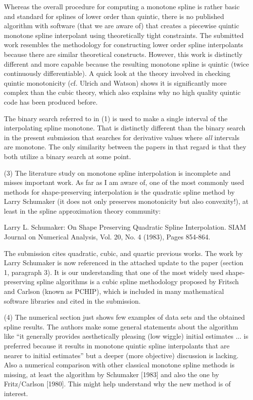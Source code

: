 Whereas the overall procedure for computing a monotone spline is rather basic and standard for splines of lower order than quintic, there is no published algorithm with software (that we are aware of) that creates a piecewise quintic monotone spline interpolant using theoretically tight constraints. The submitted work resembles the methodology for constructing lower order spline interpolants because there are similar theoretical constructs. However, this work is distinctly different and more capable because the resulting monotone spline is quintic (twice continuously differentiable). A quick look at the theory involved in checking quintic monotonicity (cf. Ulrich and Watson) shows it is significantly more complex than the cubic theory, which also explains why no high quality quintic code has been produced before.

The binary search referred to in (1) is used to make a single interval of the interpolating spline monotone. That is distinctly different than the binary search in the present submission that searches for derivative values where {\it all} intervals are monotone. The only similarity between the papers in that regard is that they both utilize a binary search at some point.

{\parindent=20pt \it

\item{(3)} The literature study on monotone spline interpolation is incomplete and misses important work. As far as I am aware of, one of the most commonly used methods for shape-preserving interpolation is the quadratic spline method by Larry Schumaker (it does not only preserves monotonicity but also convexity!), at least in the spline approximation theory community:

\itemitem{} Larry L. Schumaker: On Shape Preserving Quadratic Spline Interpolation. SIAM Journal on Numerical Analysis, Vol. 20, No. 4 (1983), Pages 854-864.

}

The submission cites quadratic, cubic, and quartic previous works. The work by Larry Schumaker is now referenced in the attached update to the paper (section 1, paragraph 3). It is our understanding that one of the most widely used shape-preserving spline algorithms is a cubic spline methodology proposed by Fritsch and Carlson (known as PCHIP), which is included in many mathematical software libraries and cited in the submission. 

{\parindent=20pt \it

\item{(4)} The numerical section just shows few examples of data sets and the obtained spline results. The authors make some general statements about the algorithm like ``it generally provides aesthetically pleasing (low wiggle) initial estimates ... is preferred because it results in monotone quintic spline interpolants that are nearer to initial estimates'' but a deeper (more objective) discussion is lacking. Also a numerical comparison with other classical monotone spline methods is missing, at least the algorithm by Schumaker [1983] and also the one by Fritz/Carlson [1980]. This might help understand why the new method is of interest.

}

